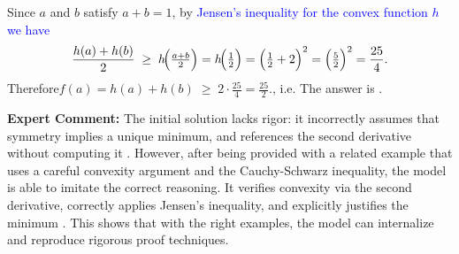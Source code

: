 \begin{examplebox}
      Since \(a\) and \(b\) satisfy \(a+b=1\), by \textcolor{blue}{Jensen’s inequality for the convex function \(h\) we have}
    \[
      \frac{h(a)+h(b)}2
      \;\ge\;
      h\!\Bigl(\tfrac{a+b}2\Bigr)
      =h\!\Bigl(\tfrac12\Bigr)
      =\Bigl(\tfrac12+2\Bigr)^2
      =\Bigl(\tfrac52\Bigr)^2
      =\frac{25}4.
    \]
    Therefore$f(a)=h(a)+h(b)\;\ge\;2\cdot\frac{25}4=\frac{25}{2}.$, i.e. The answer is .

\textbf{Expert Comment:} The initial solution lacks rigor: it incorrectly assumes that symmetry implies a unique minimum, and references the second derivative without computing it \wronghl. However, after being provided with a related example that uses a careful convexity argument and the Cauchy-Schwarz inequality, the model is able to imitate the correct reasoning. It verifies convexity via the second derivative, correctly applies Jensen’s inequality, and explicitly justifies the minimum \correcthl. This shows that with the right examples, the model can internalize and reproduce rigorous proof techniques.
\end{examplebox}

